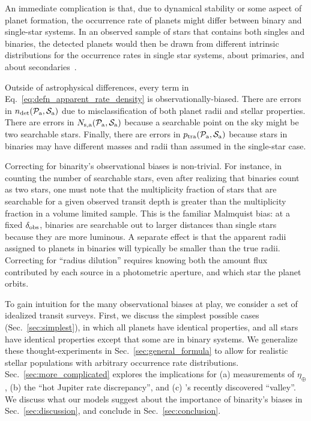 \documentclass[12pt,modern]{aastex61}
\newcommand{\pp}{\mathcal{P}}
\newcommand{\ps}{\mathcal{S}}
\renewcommand{\a}{_{\rm a}}
\begin{document}
An immediate complication is that, due to dynamical stability or some 
aspect of planet formation, the occurrence rate of planets might differ 
between binary and single-star systems.
In an observed sample of stars that contains both singles and binaries, the 
detected planets would then be drawn from different intrinsic 
distributions for the occurrence rates in single star systems, 
about primaries, and about secondaries~\citep[{\it 
e.g.},][]{wang_occurrence_2015}.

Outside of astrophysical differences, every term in 
Eq.~\ref{eq:defn_apparent_rate_density} is observationally-biased.
There are errors in $n_{\rm det}(\pp\a,\ps\a)$ due to misclassification of 
both planet radii and stellar properties.
There are errors in $N_{{\rm s,a}}(\pp\a,\ps\a)$ because a 
searchable point on the sky might be two searchable stars.
Finally, there are errors in $p_{\rm tra}(\pp\a,\ps\a)$ because stars in 
binaries may have different masses and radii than assumed in the single-star 
case.

Correcting for binarity's observational biases is non-trivial.
For instance, in counting the number of searchable stars, even after realizing 
that binaries count as two stars, one must note that the multiplicity fraction 
of stars that are searchable for a given observed transit depth is greater 
than the multiplicity fraction in a volume limited sample.
This is the familiar Malmquist bias: at a fixed $\delta_{\rm obs}$, binaries 
are searchable out to larger distances than single stars because they are more 
luminous.
A separate effect is that the apparent radii assigned to planets in binaries 
will typically be smaller than the true radii.
Correcting for ``radius dilution'' requires knowing both the amount flux 
contributed by each source in a photometric aperture, and which star the 
planet orbits.


To gain intuition for the many observational biases at play,
we consider a set of idealized transit surveys.
First, we discuss the simplest possible cases (Sec.~\ref{sec:simplest}), in 
which all planets have identical properties, and all stars have identical 
properties except that some are in binary systems.
We generalize these thought-experiments in 
Sec.~\ref{sec:general_formula} to allow for realistic stellar populations with 
arbitrary occurrence rate distributions.
Sec.~\ref{sec:more_complicated} explores the implications for
(a) measurements of $\eta_\oplus$,
(b) the ``hot Jupiter rate discrepancy'', and 
(c) \citet{fulton_california-_2017}'s recently discovered ``valley''.
We discuss what our models suggest about the importance of binarity's biases 
in Sec.~\ref{sec:discussion}, and conclude in Sec.~\ref{sec:conclusion}.
\end{document}
